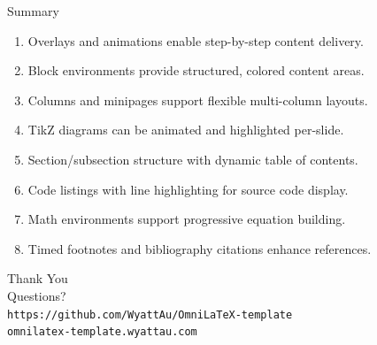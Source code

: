 \documentclass[
  doctype=beamer,
  beameraspectratio=169,
  beamertheme=Madrid,
  institution=generic,
]{omnilatex}
\begin{document}

\begin{frame}{Summary}
  \begin{enumerate}
    \item Overlays and animations enable step-by-step content delivery.
    \item Block environments provide structured, colored content areas.
    \item Columns and minipages support flexible multi-column layouts.
    \item TikZ diagrams can be animated and highlighted per-slide.
    \item Section/subsection structure with dynamic table of contents.
    \item Code listings with line highlighting for source code display.
    \item Math environments support progressive equation building.
    \item Timed footnotes and bibliography citations enhance references.
  \end{enumerate}
\end{frame}


\begin{frame}[plain,c]
  \vspace{2cm}
  {\huge Thank You}\\[1cm]
  {\large Questions?}\\[2cm]
  {\footnotesize
  \texttt{https://github.com/WyattAu/OmniLaTeX-template}\\
  \texttt{omnilatex-template.wyattau.com}
  }
\end{frame}


\appendix
\end{document}
